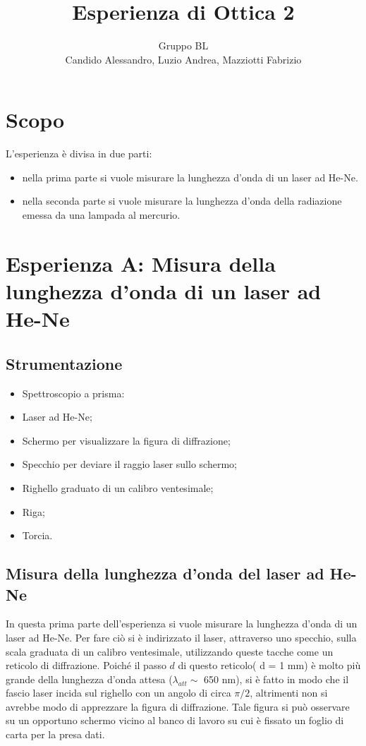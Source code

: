 \documentclass[a4paper,10pt]{article}
\title{Esperienza di Ottica 2}
\author{Gruppo BL \\ Candido Alessandro, Luzio Andrea, Mazziotti Fabrizio}
\begin{document}
\maketitle

\section{Scopo}
L'esperienza è divisa in due parti:
\begin{itemize}
	\item nella prima parte si vuole misurare la lunghezza d'onda di un laser ad He-Ne.
	\item nella seconda parte si vuole misurare la lunghezza d'onda della radiazione emessa da una lampada al mercurio.
\end{itemize}

\section{Esperienza A: Misura della lunghezza d'onda di un laser ad He-Ne}

\subsection{Strumentazione}

\begin{itemize}
	\item Spettroscopio a prisma:
	\item Laser ad He-Ne;
	\item Schermo per visualizzare la figura di diffrazione;
	\item Specchio per deviare il raggio laser sullo schermo;
	\item Righello graduato di un calibro ventesimale;
	\item Riga;
	\item Torcia.
\end{itemize}

\subsection{Misura della lunghezza d'onda del laser ad He-Ne}
In questa prima parte dell'esperienza si vuole misurare la lunghezza d'onda di un laser ad He-Ne. Per fare ciò si è indirizzato il laser, attraverso uno specchio, sulla scala graduata di un calibro ventesimale, utilizzando queste tacche come un reticolo di diffrazione. Poiché il passo $d$ di questo reticolo( d = 1 mm) è molto più grande della lunghezza d'onda attesa ($\lambda_{att} \sim$ 650 nm), si è fatto in modo che il fascio laser incida sul righello con un angolo di circa $\pi/2$, altrimenti non si avrebbe modo di apprezzare la figura di diffrazione.
Tale figura si può osservare su un opportuno schermo vicino al banco di lavoro su cui è fissato un foglio di carta per la presa dati.
\end{document}
